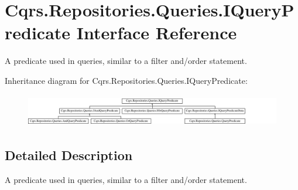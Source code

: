 \hypertarget{interfaceCqrs_1_1Repositories_1_1Queries_1_1IQueryPredicate}{}\section{Cqrs.\+Repositories.\+Queries.\+I\+Query\+Predicate Interface Reference}
\label{interfaceCqrs_1_1Repositories_1_1Queries_1_1IQueryPredicate}


A predicate used in queries, similar to a filter and/order statement.  


Inheritance diagram for Cqrs.\+Repositories.\+Queries.\+I\+Query\+Predicate\+:\begin{figure}[H]
\begin{center}
\leavevmode
\includegraphics[height=1.443299cm]{interfaceCqrs_1_1Repositories_1_1Queries_1_1IQueryPredicate}
\end{center}
\end{figure}


\subsection{Detailed Description}
A predicate used in queries, similar to a filter and/order statement. 

